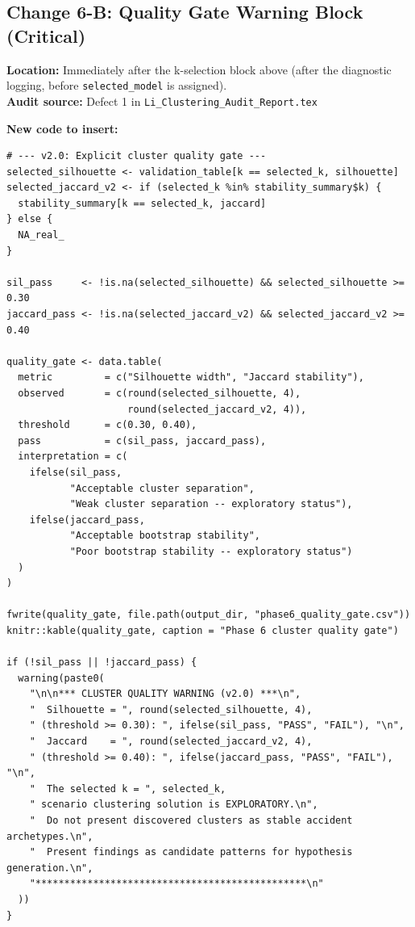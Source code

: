 \documentclass[11pt]{article}
\newcommand{\rfile}[1]{\texttt{#1}}
\newcommand{\rcode}[1]{\texttt{#1}}
\begin{document}
\subsection{Change 6-B: Quality Gate Warning Block (Critical)}

\textbf{Location:} Immediately after the k-selection block above
(after the diagnostic logging, before \rcode{selected\_model} is assigned).\\
\textbf{Audit source:} Defect 1 in \rfile{Li\_Clustering\_Audit\_Report.tex}

\textbf{New code to insert:}
\begin{lstlisting}
# --- v2.0: Explicit cluster quality gate ---
selected_silhouette <- validation_table[k == selected_k, silhouette]
selected_jaccard_v2 <- if (selected_k %in% stability_summary$k) {
  stability_summary[k == selected_k, jaccard]
} else {
  NA_real_
}

sil_pass     <- !is.na(selected_silhouette) && selected_silhouette >= 0.30
jaccard_pass <- !is.na(selected_jaccard_v2) && selected_jaccard_v2 >= 0.40

quality_gate <- data.table(
  metric         = c("Silhouette width", "Jaccard stability"),
  observed       = c(round(selected_silhouette, 4),
                     round(selected_jaccard_v2, 4)),
  threshold      = c(0.30, 0.40),
  pass           = c(sil_pass, jaccard_pass),
  interpretation = c(
    ifelse(sil_pass,
           "Acceptable cluster separation",
           "Weak cluster separation -- exploratory status"),
    ifelse(jaccard_pass,
           "Acceptable bootstrap stability",
           "Poor bootstrap stability -- exploratory status")
  )
)

fwrite(quality_gate, file.path(output_dir, "phase6_quality_gate.csv"))
knitr::kable(quality_gate, caption = "Phase 6 cluster quality gate")

if (!sil_pass || !jaccard_pass) {
  warning(paste0(
    "\n\n*** CLUSTER QUALITY WARNING (v2.0) ***\n",
    "  Silhouette = ", round(selected_silhouette, 4),
    " (threshold >= 0.30): ", ifelse(sil_pass, "PASS", "FAIL"), "\n",
    "  Jaccard    = ", round(selected_jaccard_v2, 4),
    " (threshold >= 0.40): ", ifelse(jaccard_pass, "PASS", "FAIL"), "\n",
    "  The selected k = ", selected_k,
    " scenario clustering solution is EXPLORATORY.\n",
    "  Do not present discovered clusters as stable accident archetypes.\n",
    "  Present findings as candidate patterns for hypothesis generation.\n",
    "***********************************************\n"
  ))
}
\end{lstlisting}
\end{document}
